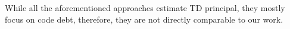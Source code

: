 While all the aforementioned approaches estimate TD principal, they mostly focus on code debt, therefore, they are not directly comparable to our work.





